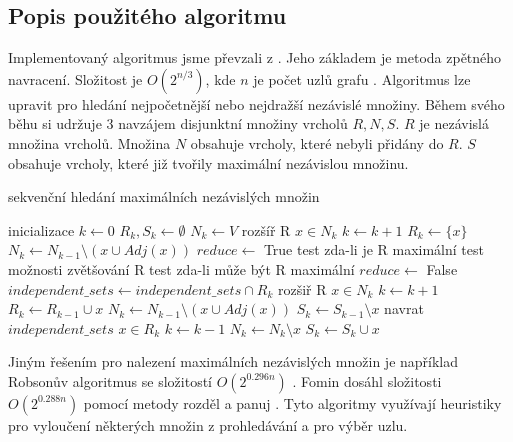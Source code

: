 \documentclass[12pt]{article}
\begin{document}
\subsection{Popis použitého algoritmu}
Implementovaný algoritmus jsme převzali z \cite{demel}. Jeho základem je metoda zpětného navracení. Složitost je \(O(2^{n/3})\), kde \(n\) je počet uzlů grafu \cite{tarjan}. Algoritmus lze upravit pro hledání nejpočetnější nebo nejdražší nezávislé množiny. Během svého běhu si udržuje 3 navzájem disjunktní množiny vrcholů \(R, N, S\). \(R\) je nezávislá množina vrcholů. Množina \(N\) obsahuje vrcholy, které nebyli přidány do \(R\). \(S\) obsahuje vrcholy, které již tvořily maximální nezávislou množinu.

\begin{algorithm}[H]
\caption{sekvenční hledání maximálních nezávislých množin}
\begin{algorithmic}
\State \Comment inicializace
\State $k \leftarrow 0$
\State $R_k, S_k \leftarrow \emptyset$
\State $N_k \leftarrow V$
\State \Comment rozšíř R
\State $x \in N_k$
\State $k \leftarrow k+1$
\State $R_k \leftarrow \{x\}$
\State $N_k \leftarrow N_{k-1} \setminus ({x} \cup Adj(x))$
  \State $reduce \leftarrow$ True
  \State \Comment test zda-li je R maximální                           
    \State \Comment test možnosti zvětšování R
      \State \Comment test zda-li může být R maximální
        \State $reduce \leftarrow$ False
      \EndIf    
    \EndIf
  \Else
    \State $independent\_sets \leftarrow independent\_sets \cap {R_k}$
  \EndIf  
    \State \Comment rozšiř R
    \State $x \in N_k$
    \State $k \leftarrow k+1$
    \State $R_k \leftarrow R_{k-1} \cup {x}$    
    \State $N_k \leftarrow N_{k-1} \setminus ({x} \cup Adj(x))$
    \State $S_k \leftarrow S_{k-1} \setminus {x}$
  \Else
    \State \Comment navrat
      \State \Return $independent\_sets$
    \EndIf
    \State $x \in R_k$
    \State $k \leftarrow k - 1$
    \State $N_k \leftarrow N_k \setminus {x}$
    \State $S_k \leftarrow S_k \cup {x}$
  \EndIf
\EndWhile
\EndFunction
\end{algorithmic}
\end{algorithm}

Jiným řešením pro nalezení maximálních nezávislých množin je například Robsonův algoritmus se složitostí \(O(2^{0.296n})\) \cite{robson}. Fomin dosáhl složitosti \(O(2^{0.288n})\) pomocí metody rozděl a panuj \cite{fomin}. Tyto algoritmy využívají heuristiky pro vyloučení některých množin z prohledávání a pro výběr uzlu.  
\end{document}
